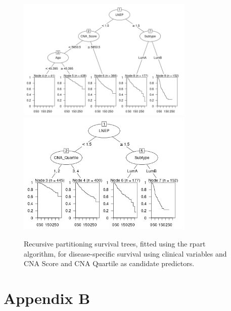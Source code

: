 \begin{figure}[!htb]
\centering
\includegraphics[width=0.75\textwidth]{../figures/Appendices/Appendix_A/LuminalAB_Rpart_DSS_Score.png}
\includegraphics[width=0.75\textwidth]{../figures/Appendices/Appendix_A/LuminalAB_Rpart_DSS_Quart.png}
\caption[Recursive partitioning survival trees, fitted using the rpart algorithm, for disease-specific survival using clinical variables and CNA Score/Quartile as candidate predictors.]{Recursive partitioning survival trees, fitted using the rpart algorithm, for disease-specific survival using clinical variables and CNA Score and CNA Quartile as candidate predictors.}
\label{fig:LumAB_Trees_Quart_Rpart}
\end{figure}

\section*{Appendix B}
\renewcommand{\thefigure}{B\arabic{figure}}
\renewcommand{\thetable}{B\arabic{table}}
\setcounter{figure}{0}
\setcounter{table}{0}

{}


